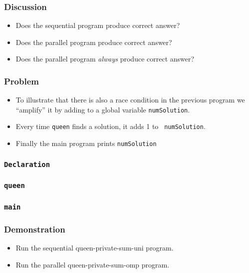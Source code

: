 \documentclass{beamer}
\begin{document}
\begin{frame}
\frametitle{Discussion}
\begin{itemize}
\item Does the sequential program produce correct answer?
\item Does the parallel program produce correct answer?
\item Does the parallel program {\em always} produce correct answer?
\end{itemize}
\end{frame}



\begin{frame}
\frametitle{Problem}
\begin{itemize}
\item To illustrate that there is also a race condition in the
  previous program we ``amplify'' it by adding to a global variable
  {\tt numSolution}.
\item Every time {\tt queen} finds a solution, it adds 1 to {\tt
  numSolution}.
\item Finally the main program prints {\tt numSolution}
\end{itemize}
\end{frame}


\begin{frame}
\frametitle{\tt Declaration} 
\end{frame}

\begin{frame}
\frametitle{\tt queen} 
\end{frame}

\begin{frame}
\frametitle{\tt main} 
\end{frame}

\begin{frame}
\frametitle{Demonstration}
\begin{itemize}
\item Run the sequential queen-private-sum-uni program.
\item Run the parallel queen-private-sum-omp program.
\end{itemize}
\end{frame}
\end{document}
